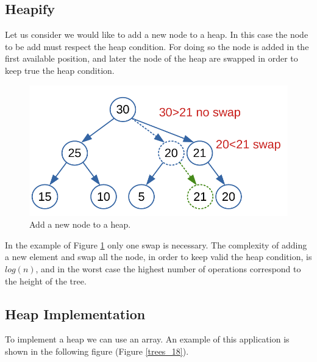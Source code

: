 \subsection{Heapify}
Let us consider we would like to add a new node to a heap. In this case the node to be add must respect the heap condition. For doing so the node is added in the first available position, and later the node of the heap are swapped in order to keep true the heap condition.

\begin{figure}[H]
	\begin{center}
		\includegraphics[scale=.6]{chapters/trees/images/trees_17.pdf}
		\caption[Add a new node to a heap.]{Add a new node to a heap.}
		\label{trees_17}
	\end{center}
\end{figure}

In the example of Figure \ref{trees_17} only one swap is necessary. The complexity of adding a new element and swap all the node, in order to keep valid the heap condition, is \(log(n)\), and in the worst case the highest number of operations correspond to the height of the tree.

\subsection{Heap Implementation}
To implement a heap we can use an array. An example of this application is shown in the following figure (Figure \ref{trees_18}).

